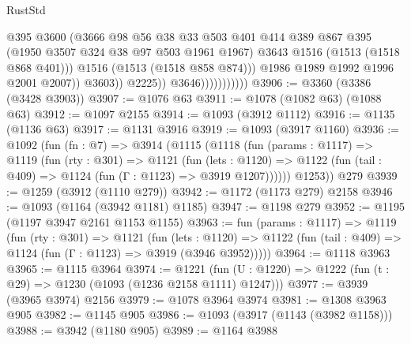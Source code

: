 \begin{lexlean}{RustStd}
\begin{coremodule}
{\begin{coremodule}
{{{{{{{{                                        @395
                                        @3600
                                        (@3666
                                          @98
                                          @56
                                          @38
                                          @33
                                          @503
                                          @401
                                          @414
                                          @389
                                          @867
                                          @395
                                          (@1950 @3507 @324 @38 @97 @503 @1961 @1967)
                                          @3643
                                          @1516
                                          (@1513 (@1518 @868 @401)))
                                        @1516
                                        (@1513 (@1518 @858 @874)))
                                      @1986
                                      @1989
                                      @1992
                                      @1996
                                      @2001
                                      @2007))
                                  @3603))
                              @2225))
                          @3646)))))))))))
@3906 := @3360 (@3386 (@3428 @3903))
@3907 := @1076 @63
@3911 := @1078 (@1082 @63) (@1088 @63)
@3912 := @1097 @2155
@3914 := @1093 (@3912 @1112)
@3916 := @1135 (@1136 @63)
@3917 := @1131 @3916
@3919 := @1093 (@3917 @1160)
@3936 := @1092
    (fun (fn : @7) =>
    @3914
      (@1115
        (@1118
          (fun (params : @1117) =>
          @1119
            (fun (rty : @301) =>
            @1121
              (fun (lets : @1120) =>
              @1122 (fun (tail : @409) => @1124 (fun (Γ : @1123) => @3919 @1207))))))
        @1253))
    @279
@3939 := @1259 (@3912 (@1110 @279))
@3942 := @1172 (@1173 @279) @2158
@3946 := @1093 (@1164 (@3942 @1181) @1185)
@3947 := @1198 @279
@3952 := @1195 (@1197 @3947 @2161 @1153 @1155)
@3963 := fun (params : @1117) =>
  @1119
    (fun (rty : @301) =>
    @1121
      (fun (lets : @1120) =>
      @1122 (fun (tail : @409) => @1124 (fun (Γ : @1123) => @3919 (@3946 @3952)))))
@3964 := @1118 @3963
@3965 := @1115 @3964
@3974 := @1221 (fun (U : @1220) => @1222 (fun (t : @29) => @1230 (@1093 (@1236 @2158 @1111) @1247)))
@3977 := @3939 (@3965 @3974) @2156
@3979 := @1078 @3964 @3974
@3981 := @1308 @3963 @905
@3982 := @1145 @905
@3986 := @1093 (@3917 (@1143 (@3982 @1158)))
@3988 := @3942 (@1180 @905)
@3989 := @1164 @3988
}}}}}}}}
\end{coremodule}}
\end{coremodule}
\end{lexlean}
